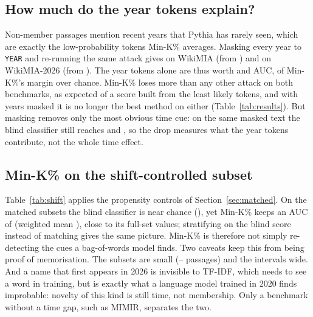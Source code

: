 \documentclass[11pt]{article}
\begin{document}
\subsection{How much do the year tokens explain?}
\label{sec:masking}

Non-member passages mention recent years that Pythia has rarely seen, which are exactly the low-probability tokens Min-K\% averages. Masking every year to \texttt{YEAR} and re-running the same attack gives \MaskWikiMinK{} on WikiMIA (from \RepMinK{}) and \MaskNewMinK{} on WikiMIA-2026 (from \NewMinK{}). The year tokens alone are thus worth \MaskWikiDrop{} and \MaskNewDrop{} AUC, \MaskShareRange{} of Min-K\%'s margin over chance. Min-K\% loses more than any other attack on both benchmarks, as expected of a score built from the least likely tokens, and with years masked it is no longer the best method on either (Table~\ref{tab:results}). But masking removes only the most obvious time cue: on the same masked text the blind classifier still reaches \BlindWikiNoyr{} and \BlindNewNoyr{}, so the drop measures what the year tokens contribute, not the whole time effect.

\subsection{Min-K\% on the shift-controlled subset}
\label{sec:shiftres}

Table~\ref{tab:shift} applies the propensity controls of Section~\ref{sec:matched}. On the matched subsets the blind classifier is near chance (\ShiftBlindRange{}), yet Min-K\% keeps an AUC of \ShiftMinKRange{} (weighted mean \ShiftMinKPooled{}), close to its full-set values; stratifying on the blind score instead of matching gives the same picture. Min-K\% is therefore not simply re-detecting the cues a bag-of-words model finds. Two caveats keep this from being proof of memorisation. The subsets are small (\ShiftNMin{}--\ShiftNMax{} passages) and the intervals wide. And a name that first appears in 2026 is invisible to TF-IDF, which needs to see a word in training, but is exactly what a language model trained in 2020 finds improbable: novelty of this kind is still time, not membership. Only a benchmark without a time gap, such as MIMIR, separates the two.

\begin{table}[t]
\centering\scriptsize
\setlength{\tabcolsep}{2.6pt}

\caption{Shift-controlled evaluation. \emph{Matched}: members and non-members paired on the blind TF-IDF score (Section~\ref{sec:matched}); $n$ passages; the blind classifier's own AUC on the subset, then Min-K\%'s with a bootstrap 95\% CI. \emph{Stratified}: Min-K\% AUC over member/non-member pairs in the same blind-score quintile.}
\label{tab:shift}
\end{table}
\end{document}

